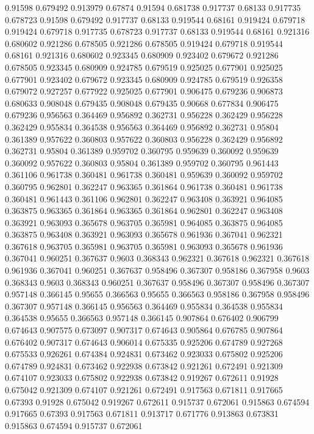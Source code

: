 0.91598 0.679492
0.913979 0.67874
0.91594 0.681738
0.917737 0.68133
0.917735 0.678723
0.91598 0.679492
0.917737 0.68133
0.919544 0.68161
0.919424 0.679718
0.919424 0.679718
0.917735 0.678723
0.917737 0.68133
0.919544 0.68161
0.921316 0.680602
0.921286 0.678505
0.921286 0.678505
0.919424 0.679718
0.919544 0.68161
0.921316 0.680602
0.923345 0.680909
0.923402 0.679672
0.921286 0.678505
0.923345 0.680909
0.924785 0.679519
0.925025 0.677901
0.925025 0.677901
0.923402 0.679672
0.923345 0.680909
0.924785 0.679519
0.926358 0.679072
0.927257 0.677922
0.925025 0.677901
0.906475 0.679236
0.906873 0.680633
0.908048 0.679435
0.908048 0.679435
0.90668 0.677834
0.906475 0.679236
0.956563 0.364469
0.956892 0.362731
0.956228 0.362429
0.956228 0.362429
0.955834 0.364538
0.956563 0.364469
0.956892 0.362731
0.95804 0.361389
0.957622 0.360803
0.957622 0.360803
0.956228 0.362429
0.956892 0.362731
0.95804 0.361389
0.959702 0.360795
0.959639 0.360092
0.959639 0.360092
0.957622 0.360803
0.95804 0.361389
0.959702 0.360795
0.961443 0.361106
0.961738 0.360481
0.961738 0.360481
0.959639 0.360092
0.959702 0.360795
0.962801 0.362247
0.963365 0.361864
0.961738 0.360481
0.961738 0.360481
0.961443 0.361106
0.962801 0.362247
0.963408 0.363921
0.964085 0.363875
0.963365 0.361864
0.963365 0.361864
0.962801 0.362247
0.963408 0.363921
0.963093 0.365678
0.963705 0.365981
0.964085 0.363875
0.964085 0.363875
0.963408 0.363921
0.963093 0.365678
0.961936 0.367041
0.962321 0.367618
0.963705 0.365981
0.963705 0.365981
0.963093 0.365678
0.961936 0.367041
0.960251 0.367637
0.9603 0.368343
0.962321 0.367618
0.962321 0.367618
0.961936 0.367041
0.960251 0.367637
0.958496 0.367307
0.958186 0.367958
0.9603 0.368343
0.9603 0.368343
0.960251 0.367637
0.958496 0.367307
0.958496 0.367307
0.957148 0.366145
0.95655 0.366563
0.95655 0.366563
0.958186 0.367958
0.958496 0.367307
0.957148 0.366145
0.956563 0.364469
0.955834 0.364538
0.955834 0.364538
0.95655 0.366563
0.957148 0.366145
0.907864 0.676402
0.906799 0.674643
0.907575 0.673097
0.907317 0.674643
0.905864 0.676785
0.907864 0.676402
0.907317 0.674643
0.906014 0.675335
0.925206 0.674789
0.927268 0.675533
0.926261 0.674384
0.924831 0.673462
0.923033 0.675802
0.925206 0.674789
0.924831 0.673462
0.922938 0.673842
0.921261 0.672491
0.921309 0.674107
0.923033 0.675802
0.922938 0.673842
0.919267 0.672611
0.91928 0.675042
0.921309 0.674107
0.921261 0.672491
0.917563 0.671811
0.917665 0.67393
0.91928 0.675042
0.919267 0.672611
0.915737 0.672061
0.915863 0.674594
0.917665 0.67393
0.917563 0.671811
0.913717 0.671776
0.913863 0.673831
0.915863 0.674594
0.915737 0.672061
